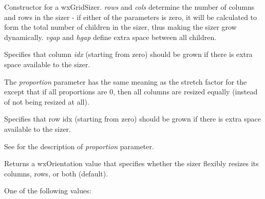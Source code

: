 Constructor for a wxGridSizer. {\it rows} and {\it cols} determine the number of
columns and rows in the sizer - if either of the parameters is zero, it will be
calculated to form the total number of children in the sizer, thus making the
sizer grow dynamically. {\it vgap} and {\it hgap} define extra space between
all children.


\label{wxflexgridsizeraddgrowablecol}


Specifies that column {\it idx} (starting from zero) should be grown if
there is extra space available to the sizer.

The {\it proportion} parameter has the same meaning as the stretch factor for
the  except that if all proportions are $0$,
then all columns are resized equally (instead of not being resized at all).

\label{wxflexgridsizeraddgrowablerow}


Specifies that row idx (starting from zero) should be grown if there
is extra space available to the sizer.

See  for the description
of {\it proportion} parameter.

\label{wxflexgridsizergetflexibledrection}


Returns a wxOrientation value that specifies whether the sizer flexibly
resizes its columns, rows, or both (default).


One of the following values:

\begin{twocollist}
\end{twocollist}




